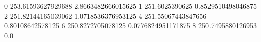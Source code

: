 0 253.61593627929688 2.8663482666015625
1 251.6025390625 0.8529510498046875
2 251.82144165039062 1.0718536376953125
4 251.55067443847656 0.80108642578125
6 250.8272705078125 0.0776824951171875
8 250.7495880126953 0.0
